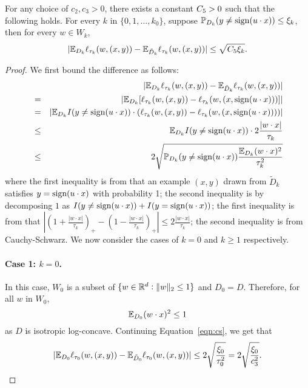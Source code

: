 \begin{lemma}
For any choice of $c_2, c_3 > 0$, there exists a constant
$C_5  > 0$ such that the following holds. For every $k$ in $\{0,1,\ldots,k_0\}$, suppose $\mathbb{P}_{D_k}(y \neq \operatorname{sign}(u \cdot x)) \leq \xi_k$, then for every
$w \in W_k$,
\begin{equation}
| \mathbb{E}_{D_k} \ell_{\tau_k}(w, (x, y)) - \mathbb{E}_{\tilde{D}_k} \ell_{\tau_k}(w, (x, y)) |
\leq
\sqrt{C_5  \xi_k}.
\label{eqn:lossdiff}
\end{equation}
\label{lem:noisy-hinge}
\end{lemma}
\begin{proof}
We first bound the difference as follows:
\begin{eqnarray}
&& |\mathbb{E}_{D_k} \ell_{\tau_k}(w, (x, y)) - \mathbb{E}_{\tilde{D}_k} \ell_{\tau_k}(w, (x, y)) | \nonumber \\
&=& |\mathbb{E}_{D_k} [\ell_{\tau_k}(w, (x, y)) - \ell_{\tau_k}(w, (x, \operatorname{sign}(u \cdot x)))] | \nonumber \\
&=& | \mathbb{E}_{D_k} I(y \neq \operatorname{sign}(u \cdot x)) \cdot (\ell_{\tau_k}(w, (x, y)) - \ell_{\tau_k}(w, (x, \operatorname{sign}(u \cdot x)))) | \nonumber \\
&\leq& \mathbb{E}_{D_k} I(y \neq \operatorname{sign}(u \cdot x)) \cdot 2\frac{|w \cdot x|}{\tau_k} \nonumber \\
&\leq& 2 \sqrt{ \mathbb{P}_{D_k}(y \neq \operatorname{sign}(u \cdot x)) \frac{\mathbb{E}_{D_k} (w \cdot x)^2 }{\tau_k^2} }
\label{eqn:cs}
\end{eqnarray}
where the first inequality is from that an example $(x,y)$ drawn from $\tilde{D}_k$ satisfies
$y = \operatorname{sign}(u \cdot x)$ with probability 1; the second inequality is by decomposing $1$ as
 $I(y \neq \operatorname{sign}(u \cdot x)) + I(y = \operatorname{sign}(u \cdot x))$; the first inequality is from that
$|(1+\frac{|w \cdot x|}{\tau_k})_+ - (1-\frac{|w \cdot x|}{\tau_k})_+| \leq 2\frac{|w \cdot x|}{\tau_k}$;
the second inequality is from Cauchy-Schwarz. We now consider the cases of $k=0$ and $k \geq 1$ respectively.
\paragraph{Case 1: $k = 0$.} In this case, $W_0$ is a subset of $\{w \in \mathbb{R}^d: \| w \|_2 \leq 1\}$ and $D_0 = D$.
Therefore, for all $w$ in $W_0$,
\[ \mathbb{E}_{D_0} (w \cdot x)^2 \leq 1 \]
as $D$ is isotropic log-concave. Continuing Equation~\eqref{eqn:cs}, we get that
\[ |\mathbb{E}_{D_0} \ell_{\tau_0}(w, (x, y)) - \mathbb{E}_{\tilde{D}_0} \ell_{\tau_0}(w, (x, y)) | \leq  2\sqrt{\frac{\xi_0}{\tau_0^2}} = 2\sqrt{\frac{\xi_0}{c_3^2}}. \]


\end{proof}
